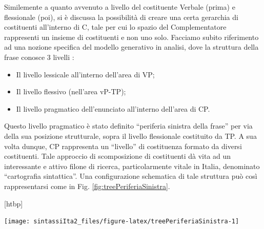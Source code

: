 \documentclass[
  a4paper,
  twoside,
  11pt,
  chapterprefix=false,
  bibliography=totocnumbered,
  listof=flat]{scrbook}
\makeatletter
\providecommand{\tightlist}{%
  \setlength{\itemsep}{0pt}\setlength{\parskip}{0pt}}
\def\fps@figure{htbp}
\renewenvironment{figure}[1][\fps@figure]{
  \edef\@tempa{\noexpand\@float{figure}[#1]} 
  \@tempa
  \sffamily
}{
  \end@float
}
\makeatother
\begin{document}
Similemente a quanto avvenuto a livello del costituente Verbale (prima) e flessionale (poi), si è discussa la possibilità di creare una certa gerarchia di costituenti all'interno di C, tale per cui lo spazio del Complementatore rappresenti un insieme di costituenti e non uno solo.
Facciamo subito riferimento ad una nozione specifica del modello generativo in analisi, dove la struttura della frase conosce 3 livelli \citep{rizzi1997}:

\begin{itemize}
\tightlist
\item
  Il livello lessicale all'interno dell'area di VP;
\item
  Il livello flessivo (nell'area vP-TP);
\item
  Il livello pragmatico dell'enunciato all'interno dell'area di CP.
\end{itemize}

Questo livello pragmatico è stato definito \enquote{periferia sinistra della frase} per via della sua posizione strutturale, sopra il livello flessionale costituito da TP.
A sua volta dunque, CP rappresenta un \enquote{livello} di costituenza formato da diversi costituenti. Tale approccio di scomposizione di costituenti dà vita ad un interessante e attivo filone di ricerca, particolarmente vitale in Italia, denominato \enquote{cartografia sintattica}. Una configurazione schematica di tale struttura può così rappresentarsi come in Fig. \ref{fig:treePeriferiaSinistra}.

\begin{figure}

{\centering \texttt{[image: sintassiIta2\_files/figure-latex/treePeriferiaSinistra-1]} 

}

\caption{Struttura della periferia sinistra della frase}\label{fig:treePeriferiaSinistra}
\end{figure}

\backmatter
  
\end{document}
